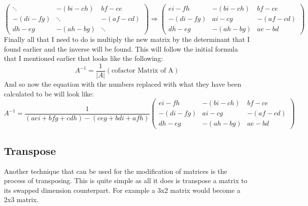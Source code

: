 \documentclass{article}
\begin{document}
\[
	\begin{pmatrix}
		\ddots & -(bi-ch) & bf-ce\\
		-(di-fg) & \ddots & -(af-cd)\\
		dh-eg & -(ah-bg) & \ddots
	\end{pmatrix}
	\Rightarrow
	\begin{pmatrix}
		ei-fh & -(bi-ch) & bf-ce\\
		-(di-fg) & ai-cg & -(af-cd)\\
		dh-eg & -(ah-bg) & ae-bd
	\end{pmatrix}

\]
	Finally all that I need to do is multiply the new matrix by the determinant that I found earlier and the inverse will be found. This will follow the initial formula that I mentioned earlier that looks like the following:
\[
	A^{-1} = \frac{1}{|A|}(\mbox{cofactor Matrix of A})
\]
And so now the equation with the numbers replaced with what they have been calculated to be will look like:
\[ 
	A^{-1} = \frac{1}{(aei + bfg + cdh) - (ceg + bdi + afh)}
	\begin{pmatrix}
		ei-fh & -(bi-ch) & bf-ce\\
		-(di-fg) & ai-cg & -(af-cd)\\
		dh-eg & -(ah-bg) & ae-bd
	\end{pmatrix}
\]

\subsection{Transpose}
Another technique that can be used for the modification of matrices is the process of transposing. This is quite simple as all it does is transpose a matrix to its swapped dimension counterpart. For example a 3x2 matrix would become a 2x3 matrix.
\end{document}
